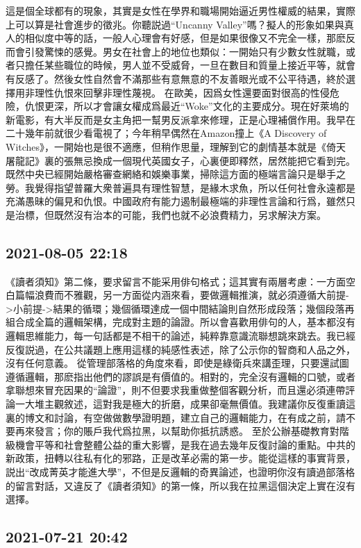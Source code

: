 \documentclass[twocolumn]{ctexart}
\begin{document}
這是個全球都有的現象，其實是女性在學界和職場開始逼近男性權威的結果，實際上可以算是社會進步的徵兆。你聽説過“Uncanny Valley”嗎？擬人的形象如果與真人的相似度中等的話，一般人心理會有好感，但是如果很像又不完全一樣，那麽反而會引發驚悚的感覺。男女在社會上的地位也類似：一開始只有少數女性就職，或者只擔任某些職位的時候，男人並不受威脅，一旦在數目和質量上接近平等，就會有反感了。然後女性自然會不滿那些有意無意的不友善眼光或不公平待遇，終於選擇用非理性仇恨來回擊非理性蔑視。
在歐美，因爲女性還要面對很高的性侵危險，仇恨更深，所以才會讓女權成爲最近“Woke”文化的主要成分。現在好萊塢的新電影，有大半反而是女主角把一幫男反派拿來修理，正是心理補償作用。我早在二十幾年前就很少看電視了；今年稍早偶然在Amazon撞上《A Discovery of Witches》，一開始也是很不適應，但稍作思量，理解到它的劇情基本就是《倚天屠龍記》裏的張無忌換成一個現代英國女子，心裏便即釋然，居然能把它看到完。
既然中央已經開始嚴格審查網絡和娛樂事業，掃除這方面的極端言論只是舉手之勞。我覺得指望普羅大衆普遍具有理性智慧，是緣木求魚，所以任何社會永遠都是充滿愚昧的偏見和仇恨。中國政府有能力遏制最極端的非理性言論和行爲，雖然只是治標，但既然沒有治本的可能，我們也就不必浪費精力，另求解決方案。
\subsection*{2021-08-05 22:18}

《讀者須知》第二條，要求留言不能采用俳句格式；這其實有兩層考慮：一方面空白篇幅浪費而不雅觀，另一方面從内涵來看，要做邏輯推演，就必須遵循大前提->小前提->結果的循環；幾個循環達成一個中間結論則自然形成段落；幾個段落再組合成全篇的邏輯架構，完成對主題的論證。所以會喜歡用俳句的人，基本都沒有邏輯思維能力，每一句話都是不相干的論述，純粹靠意識流聯想跳來跳去。我已經反復説過，在公共議題上應用這樣的純感性表述，除了公示你的智商和人品之外，沒有任何意義。
從管理部落格的角度來看，即使是綠衛兵來講歪理，只要還試圖遵循邏輯，那麽指出他們的謬誤是有價值的。相對的，完全沒有邏輯的口號，或者拿聯想來冒充因果的“論證”，則不但要求我重做整個客觀分析，而且還必須連帶評論一大堆主觀敘述，這對我是極大的折磨，成果卻毫無價值。我建議你反復重讀這裏的博文和討論，有空做做數學證明題，建立自己的邏輯能力，在有成之前，請不要再來發言；你的賬戶我代爲拉黑，以幫助你抵抗誘惑。
至於公辦基礎教育對階級機會平等和社會整體公益的重大影響，是我在過去幾年反復討論的重點。中共的新政策，扭轉以往私有化的邪路，正是改革必需的第一步。能從這樣的事實背景，説出“改成菁英才能進大學”，不但是反邏輯的奇異論述，也證明你沒有讀過部落格的留言對話，又違反了《讀者須知》的第一條，所以我在拉黑這個決定上實在沒有選擇。
\subsection*{2021-07-21 20:42}
\end{document}
